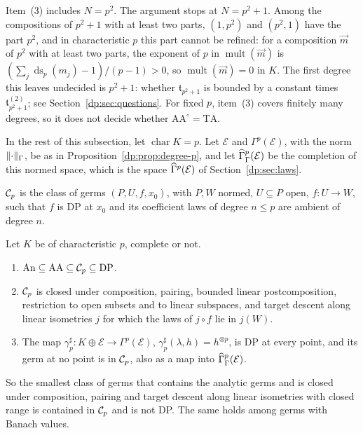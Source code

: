 Item~(3) includes $N=p^2$. The argument stops at $N=p^2+1$. Among the compositions of $p^2+1$ with at least two parts, $(1,p^2)$ and $(p^2,1)$ have the part $p^2$, and in characteristic $p$ this part cannot be refined: for a composition $\vec m$ of $p^2$ with at least two parts, the exponent of $p$ in $\operatorname{mult}(\vec m)$ is $(\sum_j\operatorname{ds}_p(m_j)-1)/(p-1)>0$, so $\operatorname{mult}(\vec m)=0$ in $K$. The first degree this leaves undecided is $p^2+1$: whether $\mathfrak t_{p^2+1}$ is bounded by a constant times $\mathfrak t^{(2)}_{p^2+1}$; see Section~\ref{dp:sec:questions}. For fixed $p$, item~(3) covers finitely many degrees, so it does not decide whether $\mathrm{AA}^\circ=\mathrm{TA}$.

In the rest of this subsection, let $\operatorname{char}K=p$. Let $\mathcal E$ and $\Gamma^p(\mathcal E)$, with the norm $\lVert \cdot\rVert_\Gamma$, be as in Proposition~\ref{dp:prop:degree-p}, and let $\widehat\Gamma^p_\Gamma(\mathcal E)$ be the completion of this normed space, which is the space $\widehat\Gamma^p(\mathcal E)$ of Section~\ref{dp:sec:laws}.

\begin{definition}\label{dp:def:cp}
$\mathcal{C}_p$ is the class of germs $(P,U,f,x_0)$, with $P,W$ normed, $U\subseteq P$ open, $f\colon U\to W$, such that $f$ is DP at $x_0$ and its coefficient laws of degree $n\le p$ are ambient of degree $n$.
\end{definition}

\begin{theorem}\label{dp:thm:cp}
Let $K$ be of characteristic $p$, complete or not.
\begin{enumerate}
\item $\mathrm{An}\subseteq\mathrm{AA}\subseteq\mathcal{C}_p\subseteq\mathrm{DP}$.
\item $\mathcal{C}_p$ is closed under composition, pairing, bounded linear postcomposition, restriction to open subsets and to linear subspaces, and target descent along linear isometries $j$ for which the laws of $j\circ f$ lie in $j(W)$.
\item The map $\gamma^\sharp_p\colon K\oplus\mathcal E\to\Gamma^p(\mathcal E)$, $\gamma^\sharp_p(\lambda,h)=h^{\otimes p}$, is DP at every point, and its germ at no point is in $\mathcal{C}_p$, also as a map into $\widehat\Gamma^p_\Gamma(\mathcal E)$.
\end{enumerate}
So the smallest class of germs that contains the analytic germs and is closed under composition, pairing and target descent along linear isometries with closed range is contained in $\mathcal{C}_p$ and is not DP. The same holds among germs with Banach values.
\end{theorem}

